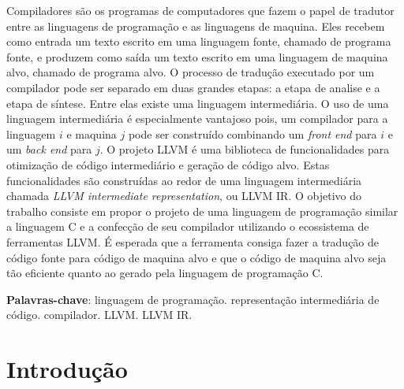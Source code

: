 \documentclass[
  12pt,
  openright,
  twoside,
  a4paper,
  english,
  brazil
]{abntex2}
\begin{document}
\pretextual{}
\hypersetup{pageanchor=false}
\imprimircapa{}
\hypersetup{pageanchor=true}
\imprimirfolhaderosto{}

\begin{folhadeaprovacao}
  
\end{folhadeaprovacao}

\begin{resumo}
Compiladores são os programas de computadores que fazem o papel de tradutor entre as linguagens de programação e as linguagens de maquina.
Eles recebem como entrada um texto escrito em uma linguagem fonte, chamado de programa fonte, e produzem como saída um texto escrito em uma linguagem de maquina alvo, chamado de programa alvo.
O processo de tradução executado por um compilador pode ser separado em duas grandes etapas: a etapa de analise e a etapa de síntese.
Entre elas existe uma linguagem intermediária.
O uso de uma linguagem intermediária é especialmente vantajoso pois, um compilador para a linguagem $i$ e maquina $j$ pode ser construído combinando um \textit{front end} para $i$ e um \textit{back end} para $j$.
O projeto LLVM é uma biblioteca de funcionalidades para otimização de código intermediário e geração de código alvo.
Estas funcionalidades são construídas ao redor de uma linguagem intermediária chamada \textit{LLVM intermediate representation}, ou LLVM IR\@.
O objetivo do trabalho consiste em propor o projeto de uma linguagem de programação similar a linguagem C e a confecção de seu compilador utilizando o ecossistema de ferramentas LLVM\@.
É esperada que a ferramenta consiga fazer a tradução de código fonte para código de maquina alvo e que o código de maquina alvo seja tão eficiente quanto ao gerado pela linguagem de programação C\@.

\vspace{\onelineskip}
\noindent
\textbf{Palavras-chave}: linguagem de programação\@. representação intermediária de código\@. compilador\@. LLVM\@. LLVM IR\@.

\end{resumo}

\begin{KeepFromToc}
  \tableofcontents
\end{KeepFromToc}

\textual{}

\chapter{Introdução}\label{cap:introducao}
\end{document}
